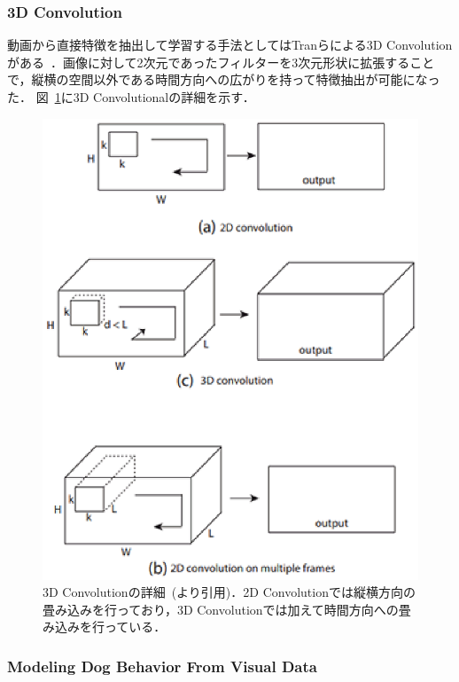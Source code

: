 \subsubsection{3D Convolution}
動画から直接特徴を抽出して学習する手法としてはTranらによる3D Convolution がある~\cite{tran14}．画像に対して2次元であったフィルターを3次元形状に拡張することで，縦横の空間以外である時間方向への広がりを持って特徴抽出が可能になった．
図~\ref{3dconv_image}に3D Convolutionalの詳細を示す．
\begin{figure}[htbp]
 \begin{center}
  \includegraphics[width=15cm]{./Figures/3dconv.eps}
  \caption{3D Convolutionの詳細~(\cite{tran14}より引用)．2D Convolutionでは縦横方向の畳み込みを行っており，3D Convolutionでは加えて時間方向への畳み込みを行っている．}
  \label{3dconv_image}
 \end{center}
\end{figure}

\subsubsection{Modeling Dog Behavior From Visual Data}

